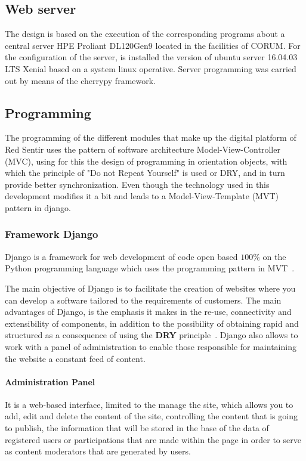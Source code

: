 \documentclass[journal,transmag]{IEEEtran}
\begin{document}
\subsection{Web server}
The design is based on the execution of the corresponding programs about a central server HPE Proliant DL120Gen9 located in the facilities of CORUM. For the configuration of the server, is installed the version of ubuntu server 16.04.03 LTS Xenial based on a system linux operative. Server programming was carried out by means of the cherrypy framework.

\subsection{Programming}
The programming of the different modules that make up the digital platform of Red Sentir uses the pattern of software architecture Model-View-Controller (MVC), using for this the design of programming in orientation objects, with which the principle of "Do not Repeat Yourself" is used or DRY, and in turn provide better synchronization. Even though the technology used in this development modifies it a bit and leads to a Model-View-Template (MVT) pattern in django.

\subsubsection{Framework Django}
Django is a framework for web development of code open based $100\%$ on the Python programming language which uses the programming pattern in MVT~\cite{Hol2009, DjangoM}.  

The main objective of Django is to facilitate the creation of websites where you can develop a software tailored to the requirements of customers. The main advantages of Django, is the emphasis it makes in the re-use, connectivity and extensibility of components, in addition to the possibility of obtaining rapid and structured as a consequence of using the \textbf{DRY} principle~\cite{Wik2014}. Django also allows to work with a panel of administration to enable those responsible for maintaining the website a constant feed of content.

\paragraph{Administration Panel}

It is a web-based interface, limited to the manage the site, which allows you to add, edit and delete the content of the site, controlling the content that is going to publish, the information that will be stored in the base of the data of registered users or participations that are made within the page in order to serve as content moderators that are generated by users.
\end{document}
